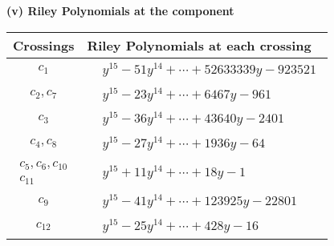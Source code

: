 \documentclass[1p]{elsarticle_modified}
\theoremstyle{definition}
\begin{document}
\newpage\renewcommand{\arraystretch}{1}
\flushleft \textbf{(v) Riley Polynomials at the component}\newline \\
\begin{tabular}{m{50pt}|m{274pt}}
Crossings & \hspace{64pt}Riley Polynomials at each crossing \\
\hline $$\begin{aligned}c_{1}\end{aligned}$$&$\begin{aligned}
&y^{15}-51 y^{14}+\cdots+52633339 y-923521
\end{aligned}$\\
\hline $$\begin{aligned}c_{2},c_{7}\end{aligned}$$&$\begin{aligned}
&y^{15}-23 y^{14}+\cdots+6467 y-961
\end{aligned}$\\
\hline $$\begin{aligned}c_{3}\end{aligned}$$&$\begin{aligned}
&y^{15}-36 y^{14}+\cdots+43640 y-2401
\end{aligned}$\\
\hline $$\begin{aligned}c_{4},c_{8}\end{aligned}$$&$\begin{aligned}
&y^{15}-27 y^{14}+\cdots+1936 y-64
\end{aligned}$\\
\hline $$\begin{aligned}c_{5},c_{6},c_{10}\\c_{11}\end{aligned}$$&$\begin{aligned}
&y^{15}+11 y^{14}+\cdots+18 y-1
\end{aligned}$\\
\hline $$\begin{aligned}c_{9}\end{aligned}$$&$\begin{aligned}
&y^{15}-41 y^{14}+\cdots+123925 y-22801
\end{aligned}$\\
\hline $$\begin{aligned}c_{12}\end{aligned}$$&$\begin{aligned}
&y^{15}-25 y^{14}+\cdots+428 y-16
\end{aligned}$\\
\hline
\end{tabular}\\~\\
\end{document}
